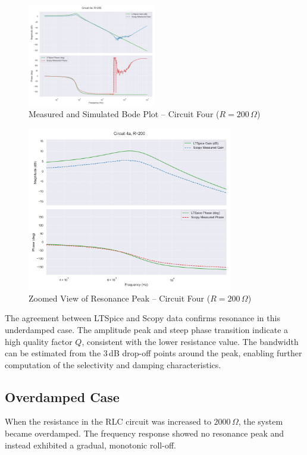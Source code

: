 \documentclass[12pt]{article}
\begin{document}
\begin{figure}[H]
	\centering
	\includegraphics[width=0.5\textwidth]{e6_bode4}
	\caption{Measured and Simulated Bode Plot – Circuit Four ($R = 200\,\Omega$)}
\end{figure}

\begin{figure}[H]
	\centering
	\includegraphics[width=0.8\textwidth]{e6_bandbode}
	\caption{Zoomed View of Resonance Peak – Circuit Four ($R = 200\,\Omega$)}
\end{figure}

The agreement between LTSpice and Scopy data confirms resonance in this underdamped case. The amplitude peak and steep phase transition indicate a high quality factor \( Q \), consistent with the lower resistance value. The bandwidth can be estimated from the 3\,dB drop-off points around the peak, enabling further computation of the selectivity and damping characteristics.

\subsection{Overdamped Case}

When the resistance in the RLC circuit was increased to $2000\,\Omega$, the system became overdamped. The frequency response showed no resonance peak and instead exhibited a gradual, monotonic roll-off.
\end{document}
